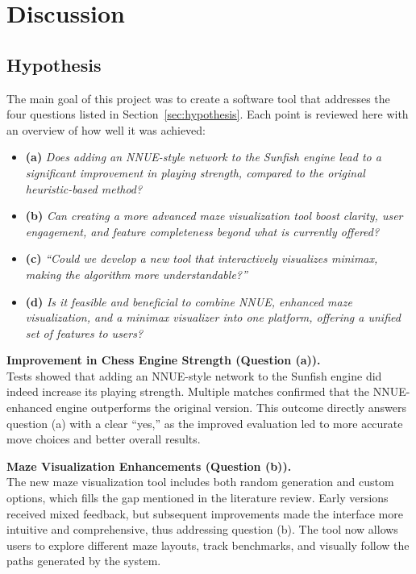 \documentclass[12pt,a4paper]{article}
\begin{document}
\section{Discussion}
\subsection{Hypothesis}

The main goal of this project was to create a software tool that addresses the
four questions listed in Section~\ref{sec:hypothesis}. Each point is reviewed
here with an overview of how well it was achieved:

\begin{itemize}[label={}, leftmargin=1em]

\item \textbf{(a)} \textit{Does adding an NNUE-style network to the Sunfish engine
lead to a significant improvement in playing strength, compared to the original
heuristic-based method?}

\item \textbf{(b)} \textit{Can creating a more advanced maze visualization tool
boost clarity, user engagement, and feature completeness beyond what is
currently offered?}

\item \textbf{(c)} \textit{“Could we develop a new tool that interactively visualizes minimax, making the algorithm more understandable?”}

\item \textbf{(d)} \textit{Is it feasible and beneficial to combine NNUE, enhanced
maze visualization, and a minimax visualizer into one platform, offering a
unified set of features to users?}

\end{itemize}

\vspace{0.5em}
\noindent
\textbf{Improvement in Chess Engine Strength (Question (a)).} \\
Tests showed that adding an NNUE-style network to the Sunfish engine did indeed
increase its playing strength. Multiple matches confirmed that the NNUE-enhanced
engine outperforms the original version. This outcome directly answers question (a)
with a clear ``yes,'' as the improved evaluation led to more accurate move choices
and better overall results.

\vspace{0.5em}
\noindent
\textbf{Maze Visualization Enhancements (Question (b)).} \\
The new maze visualization tool includes both random generation and custom
options, which fills the gap mentioned in the literature review. Early versions
received mixed feedback, but subsequent improvements made the interface more
intuitive and comprehensive, thus addressing question (b). The tool now allows
users to explore different maze layouts, track benchmarks, and visually follow the
paths generated by the system.
\end{document}
